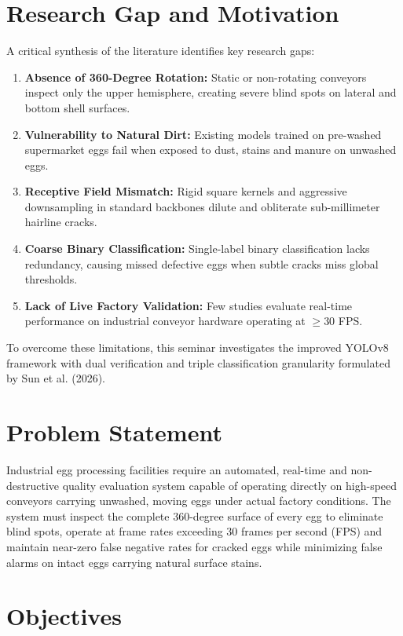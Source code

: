 \documentclass[12pt,a4paper]{report}
\begin{document}
\section{Research Gap and Motivation}

A critical synthesis of the literature identifies key research gaps:
\begin{enumerate}[label=\arabic*.]
    \item \textbf{Absence of 360-Degree Rotation:} Static or non-rotating conveyors inspect only the upper hemisphere, creating severe blind spots on lateral and bottom shell surfaces.
    \item \textbf{Vulnerability to Natural Dirt:} Existing models trained on pre-washed supermarket eggs fail when exposed to dust, stains and manure on unwashed eggs.
    \item \textbf{Receptive Field Mismatch:} Rigid square kernels and aggressive downsampling in standard backbones dilute and obliterate sub-millimeter hairline cracks.
    \item \textbf{Coarse Binary Classification:} Single-label binary classification lacks redundancy, causing missed defective eggs when subtle cracks miss global thresholds.
    \item \textbf{Lack of Live Factory Validation:} Few studies evaluate real-time performance on industrial conveyor hardware operating at $\ge 30$ FPS.
\end{enumerate}

To overcome these limitations, this seminar investigates the improved YOLOv8 framework with dual verification and triple classification granularity formulated by Sun et al. (2026).

\section{Problem Statement}

Industrial egg processing facilities require an automated, real-time and non-destructive quality evaluation system capable of operating directly on high-speed conveyors carrying unwashed, moving eggs under actual factory conditions. The system must inspect the complete 360-degree surface of every egg to eliminate blind spots, operate at frame rates exceeding 30 frames per second (FPS) and maintain near-zero false negative rates for cracked eggs while minimizing false alarms on intact eggs carrying natural surface stains.

\section{Objectives}
\end{document}

